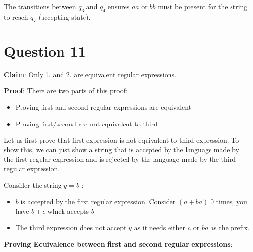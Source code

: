 \documentclass[12pt,a4paper]{article}
\begin{document}
The transitions between $q_3$ and $q_4$ ensures $aa$ or $bb$ must be present for the string to reach $q_7$ (accepting state).
\section{Question 11}

\textbf{Claim}:
Only 1. and 2. are equivalent regular expressions.


\textbf{Proof}:
There are two parts of this proof:
\begin{itemize}
    \item Proving first and second regular expressions are equivalent
    \item Proving first/second are not equivalent to third
\end{itemize}

Let us first prove that first expression is not equivalent to third expression. 
To show this, we can just show a string that is accepted by the language made by the first regular expression and is rejected by the language made by the third regular expression.

Consider the string $ y=b $ :

\begin{itemize}
    \item $b$ is accepted by the first regular expression. Consider $(a+ba)$ 0 times, you have $b +\epsilon$ which accepts $b$
    \item The third expression does not accept $y$ as it needs either $a$ or $ba$ as the prefix.
\end{itemize}

\textbf{Proving Equivalence between first and second regular expressions}:
\end{document}
